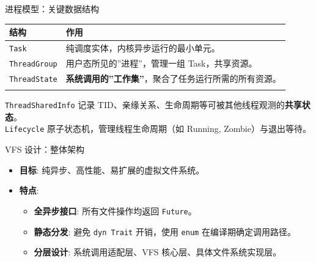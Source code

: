 \documentclass[
  ignorenonframetext,
]{beamer}
\providecommand{\tightlist}{%
  \setlength{\itemsep}{0pt}\setlength{\parskip}{0pt}}
\begin{document}
\begin{frame}[fragile]
\begin{block}{进程模型：关键数据结构}
\label{ux8fdbux7a0bux6a21ux578bux5173ux952eux6570ux636eux7ed3ux6784}
\begin{longtable}[]{@{}
  >{\raggedright\arraybackslash}p{}
  >{\raggedright\arraybackslash}p{}@{}}
\toprule\noalign{}
\begin{minipage}[b]{\linewidth}\raggedright
结构
\end{minipage} & \begin{minipage}[b]{\linewidth}\raggedright
作用
\end{minipage} \\
\midrule\noalign{}
\endhead
\texttt{Task} & 纯调度实体，内核异步运行的最小单元。 \\
\texttt{ThreadGroup} & 用户态所见的''进程''，管理一组
Task，共享资源。 \\
\texttt{ThreadState} &
\textbf{系统调用的''工作集''}，聚合了任务运行所需的所有资源。 \\
\bottomrule\noalign{}
\end{longtable}
\end{block}
\end{frame}

\begin{frame}[fragile]
\texttt{ThreadSharedInfo} \textbar{} 记录
TID、亲缘关系、生命周期等可被其他线程观测的\textbf{共享状态}。\textbar{}\\
\texttt{Lifecycle} \textbar{} 原子状态机，管理线程生命周期（如 Running,
Zombie）与退出等待。 \textbar{}
\end{frame}

\begin{frame}[fragile]
\begin{block}{VFS 设计：整体架构}
\label{vfs-ux8bbeux8ba1ux6574ux4f53ux67b6ux6784}
\begin{itemize}
\tightlist
\item
  \textbf{目标}: 纯异步、高性能、易扩展的虚拟文件系统。
\item
  \textbf{特点}:

  \begin{itemize}
  \tightlist
  \item
    \textbf{全异步接口}: 所有文件操作均返回 \texttt{Future}。
  \item
    \textbf{静态分发}: 避免 \texttt{dyn\ Trait} 开销，使用 \texttt{enum}
    在编译期确定调用路径。
  \item
    \textbf{分层设计}: 系统调用适配层、VFS 核心层、具体文件系统实现层。
  \end{itemize}
\end{itemize}
\end{block}
\end{frame}
\end{document}
